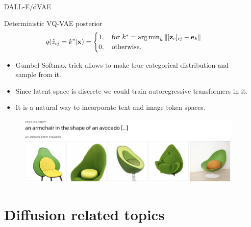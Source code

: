 \begin{frame}{DALL-E/dVAE}
	\begin{block}{Deterministic VQ-VAE posterior}
		\vspace{-0.3cm}
		\[
			q(\hat{z}_{ij} = k^* | \mathbf{x}) = \begin{cases}
				1 , \quad \text{for } k^* = \operatorname*{arg\,min}_k \| [\mathbf{z}_e]_{ij} - \mathbf{e}_k \| \\
				0, \quad \text{otherwise}.
			\end{cases}
		\]
		\vspace{-0.3cm}
	\end{block}
	\begin{itemize}
		\item Gumbel-Softmax trick allows to make true categorical distribution and sample from it.
		\item Since latent space is discrete we could train autoregressive transformers in it.
		\item It is a natural way to incorporate text and image token spaces.
	\end{itemize}
	\begin{figure}
		\includegraphics[width=\linewidth]{figs/dalle}
	\end{figure}
\end{frame}
\section{Diffusion related topics}
